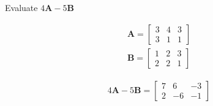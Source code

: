 Evaluate $4\boldsymbol{A} - 5\boldsymbol{B}$

\begin{align*}
    \boldsymbol{A} = \begin{bmatrix}
    3 & 4 & 3 \\
    3 & 1 & 1
    \end{bmatrix}\\
    \boldsymbol{B} = \begin{bmatrix}
    1 & 2 & 3 \\
    2 & 2 & 1
    \end{bmatrix}
\end{align*}

\begin{solution}
\begin{align*}
    4\boldsymbol{A} - 5\boldsymbol{B} = \begin{bmatrix}
    7 & 6 & -3 \\
    2 & -6 & -1
    \end{bmatrix}
\end{align*}
\end{solution}